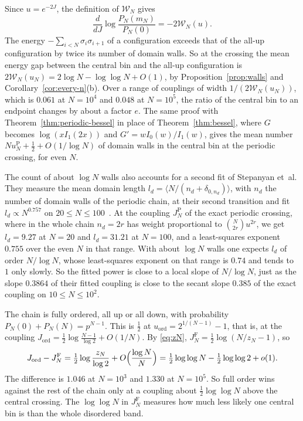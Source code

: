 Since $u=e^{-2J}$, the definition of $\mathcal W_N$ gives
\[
\frac d{dJ}\log\frac{P_N(m_N)}{P_N(0)}=-2\mathcal W_N(u).
\]
The energy
$-\sum_{i<N}\sigma_i\sigma_{i+1}$ of a configuration exceeds that of the all-up
configuration by twice its number of domain walls. So at the crossing the mean
energy gap between the central bin and the all-up configuration is
$2\mathcal W_N(u_N)=2\log N-\log\log N+O(1)$, by Proposition~\ref{prop:walls} and Corollary~\ref{cor:every-n}(b).
Over a range of couplings of width
$1/(2\mathcal W_N(u_N))$, which is $0.061$ at $N=10^4$ and $0.048$ at $N=10^5$,
the ratio of the central bin to an endpoint changes by about a factor $e$. The
same proof with Theorem~\ref{thm:periodic-bessel} in place of
Theorem~\ref{thm:bessel}, where $G$ becomes $\log(xI_1(2x))$ and
$G'=wI_0(w)/I_1(w)$, gives the mean number $Nu_N^{\mathrm P}+\frac12+O(1/\log N)$ of domain walls
in the central bin at the periodic crossing, for even $N$.

The count of about $\log N$ walls also accounts for a second fit of
Stepanyan et~al. They measure the mean
domain length $l_d=\langle N/(n_d+\delta_{0,n_d})\rangle$, with $n_d$ the
number of domain walls of the periodic chain, at their second transition and
fit $l_d\propto N^{0.757}$ on $20\le N\le100$~\cite[Eq.~(18)]{stepanyan2024}.
At the coupling $J_N^{\mathrm P}$ of the exact periodic crossing, where in the
whole chain $n_d=2r$ has weight proportional to
$\binom N{2r}u^{2r}$, we get $l_d=9.27$ at $N=20$ and $l_d=31.21$ at $N=100$,
and a least-squares exponent $0.755$ over the even $N$ in that range. With about $\log N$ walls
one expects $l_d$ of order $N/\log N$, whose least-squares exponent on that
range is $0.74$ and tends to $1$ only slowly. So the fitted power is close to a local slope of $N/\log N$, just as the slope
$0.3864$ of their fitted coupling is close to the secant slope $0.385$ of the
exact coupling on $10\le N\le10^2$.

\begin{remark}\label{rem:ordered}
The chain is fully ordered, all up or all down, with probability
$P_N(0)+P_N(N)=p^{N-1}$. This is $\frac12$ at $u_{\mathrm{ord}}=2^{1/(N-1)}-1$, that
is, at the coupling
$J_{\mathrm{ord}}=\frac12\log\frac{N-1}{\log2}+O(1/N)$. By
\eqref{eq:zN}, $J_N^{\mathrm F}=\frac12\log(N/z_N-1)$, so
\[
J_{\mathrm{ord}}-J_N^{\mathrm F}=\tfrac12\log\frac{z_N}{\log2}+O\Bigl(\frac{\log N}N\Bigr)
=\tfrac12\log\log N-\tfrac12\log\log2+o(1).
\]
The difference is $1.046$ at $N=10^3$ and $1.330$ at $N=10^5$. So full order
wins against the rest of the chain only at a coupling about $\frac12\log\log N$
above the central crossing. The $\log\log N$ in $J_N^{\mathrm F}$ measures how
much less likely one central bin is than the whole disordered band.
\end{remark}

